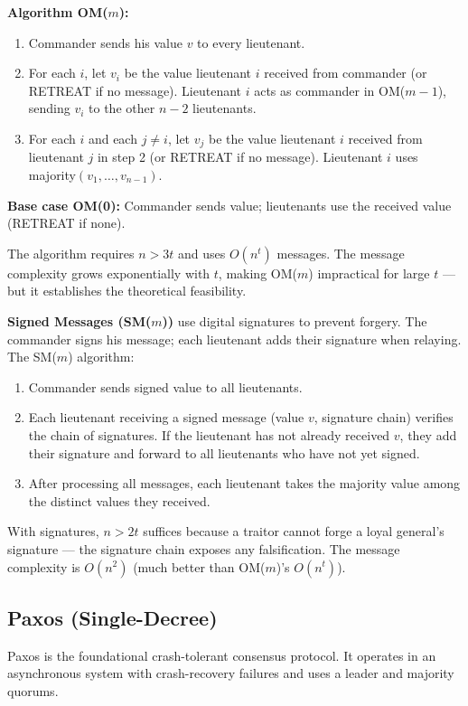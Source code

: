 \textbf{Algorithm OM($m$):}
\begin{enumerate}
\item Commander sends his value $v$ to every lieutenant.
\item For each $i$, let $v_i$ be the value lieutenant $i$ received from commander (or RETREAT if no message). Lieutenant $i$ acts as commander in OM($m-1$), sending $v_i$ to the other $n-2$ lieutenants.
\item For each $i$ and each $j \neq i$, let $v_j$ be the value lieutenant $i$ received from lieutenant $j$ in step 2 (or RETREAT if no message). Lieutenant $i$ uses majority$(v_1, \ldots, v_{n-1})$.
\end{enumerate}

\textbf{Base case OM(0):} Commander sends value; lieutenants use the received value (RETREAT if none).

The algorithm requires $n > 3t$ and uses $O(n^t)$ messages. The message complexity grows exponentially with $t$, making OM($m$) impractical for large $t$ — but it establishes the theoretical feasibility.

\textbf{Signed Messages (SM($m$))} use digital signatures to prevent forgery. The commander signs his message; each lieutenant adds their signature when relaying. The SM($m$) algorithm:
\begin{enumerate}
\item Commander sends signed value to all lieutenants.
\item Each lieutenant receiving a signed message (value $v$, signature chain) verifies the chain of signatures. If the lieutenant has not already received $v$, they add their signature and forward to all lieutenants who have not yet signed.
\item After processing all messages, each lieutenant takes the majority value among the distinct values they received.
\end{enumerate}
With signatures, $n > 2t$ suffices because a traitor cannot forge a loyal general's signature — the signature chain exposes any falsification. The message complexity is $O(n^2)$ (much better than OM($m$)'s $O(n^t)$).

\subsection{Paxos (Single-Decree)}
\label{sec:consensus:paxos}

Paxos is the foundational crash-tolerant consensus protocol. It operates in an asynchronous system with crash-recovery failures and uses a leader and majority quorums.

